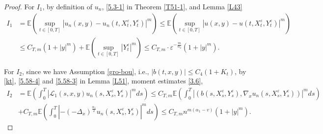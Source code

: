 \documentclass[11pt,reqno]{amsart}
\numberwithin{equation}{section}
\begin{document}
\begin{proof}
For $I_1$, by definition of $u_{n}$, \eqref{5.3-1} in Theorem \ref{T51-1}, and Lemma \ref{L43}
\begin{align}
		I_{1}&=\mathbb{E}\left( \sup_{t\in [0,T]}|u_{n}(x,y)-u_{n}(t,X_{t}^{\varepsilon},Y_{t}^{\varepsilon})|^{m}\right)\leq \mathbb{E}\left( \sup_{t\in [0,T]}|u(x,y)-u(t,X_{t}^{\varepsilon},Y_{t}^{\varepsilon})|^{m}\right)\nonumber \\
		&\leq C_{T,m}(1+|y|^{m})+\mathbb{E}\left( \sup_{t\in [0,T]}|Y_{t}^{\varepsilon}|^{m}\right)
		\leq C_{T,m}\cdot\varepsilon^{-\frac{m}{\alpha_{2}}}(1+|y|^{m}).\label{5.49}
\end{align}

For $I_{2}$, since we have Assumption \ref{gro-bou}, i.e., $|b(t,x,y)| \leq C_{4}(1+K_{t})$, by \eqref{kt}, \eqref{5.58-4} and \eqref{5.58-3} in Lemma \ref{L51}, moment estimates \eqref{3.6},
\begin{align}
	I_{2}&=\mathbb{E}\left(\int_{0}^{T}|\mathcal{L}_{1}(s,x,y)u_{n}(s,X_{s}^{\varepsilon},Y_{s}^{\varepsilon})|^{m}ds\right)\leq C_{T,m}  \mathbb{E}\left( \int_{0}^{T}|(b(s,X_{s}^{\varepsilon},Y_{s}^{\varepsilon}),\nabla_{x}u_{n}(s,X_{s}^{\varepsilon},Y_{s}^{\varepsilon}))|^{m}ds\right)\nonumber
		\\
	&+ C_{T,m} \mathbb{E}\left(\int_{0}^{T}|-(-\Delta_{x})^{\frac{\alpha_{1}}{2}}u_{n}(s,X_{s}^{\varepsilon},Y_{s}^{\varepsilon})|^{m}ds\right)\leq C_{T,m}n^{m(\alpha_{1}-v)}(1+|y|^{m}).\label{5.50}
\end{align}

	

\end{proof}
\end{document}
